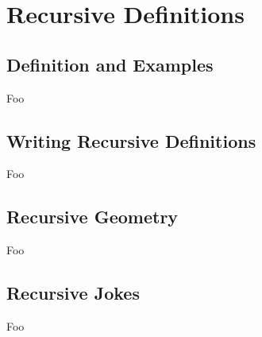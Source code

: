 \section{Recursive Definitions}

\subsection{Definition and Examples}

Foo

\subsection{Writing Recursive Definitions}

Foo

\subsection{Recursive Geometry}

Foo

\subsection{Recursive Jokes}

Foo

